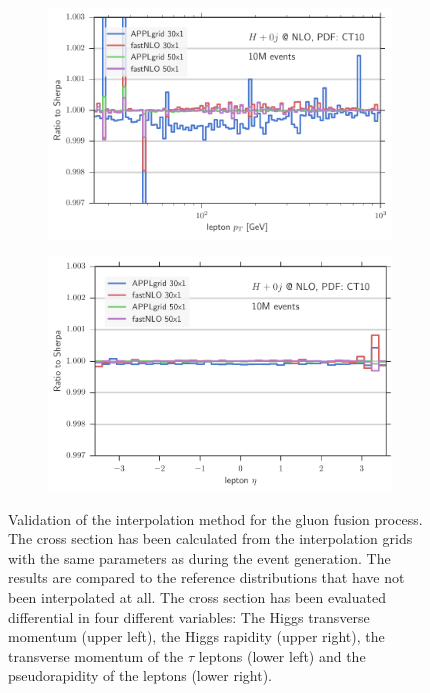 \begin{figure}
\begin{subfigure}[]{0.49\textwidth}
	\includegraphics[width=\textwidth]{images/hnlo_lpt_50v30.pdf}
\end{subfigure}
\hfill
\begin{subfigure}[]{0.49\textwidth}
	\includegraphics[width=\textwidth]{images/hnlo_leta_50v30.pdf}
\end{subfigure}
\caption{Validation of the interpolation method for the gluon fusion process.
		The cross section has been calculated from the interpolation grids with the same parameters as during the event generation.
		The results are compared to the reference distributions that have not been interpolated at all.
		The cross section has been evaluated differential in four different variables: The Higgs transverse momentum (upper left), the Higgs rapidity (upper right), the transverse momentum of the $\tau$ leptons (lower left) and the pseudorapidity of the leptons (lower right).}
\label{fig:hnlo_validation}
\end{figure}
